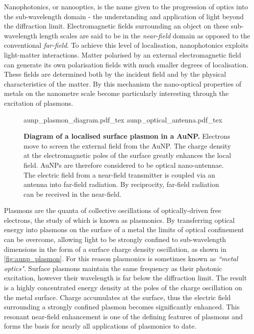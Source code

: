 \documentclass[12pt, a4paper, twoside]{book}
\begin{document}
Nanophotonics, or nanooptics, is the name given to the progression of optics into the sub-wavelength domain - the understanding and application of light beyond the diffraction limit. Electromagnetic fields surrounding an object on these sub-wavelength length scales are said to be in the \emph{near-field} domain as opposed to the conventional \emph{far-field}. To achieve this level of localisation, nanophotonics exploits light-matter interactions. Matter polarised by an external electromagnetic field can generate its own polarisation fields with much smaller degrees of localisation. These fields are determined both by the incident field and by the physical characteristics of the matter. By this mechanism the nano-optical properties of metals on the nanometre scale become particularly interesting through the excitation of plasmons.

\begin{figure}[bt]
\centering
\fontsize{10pt}{1em}\selectfont
\def\svgwidth{0.6\textwidth}
{aunp_plasmon_diagram.pdf_tex}
\def\svgwidth{0.35\textwidth}
{aunp_optical_antenna.pdf_tex}
\caption[Diagram of a localised surface plasmon in a AuNP.]{\textbf{Diagram of a localised surface plasmon in a AuNP.} Electrons move to screen the external field from the AuNP. The charge density at the electromagnetic poles of the surface greatly enhances the local field. AuNPs are therefore considered to be optical nano-antennae. The electric field from a near-field transmitter is coupled via an antenna into far-field radiation. By reciprocity, far-field radiation can be received in the near-field.}
\label{fig:aunp_plasmon}
\end{figure}

Plasmons are the quanta of collective oscillations of optically-driven free electrons, the study of which is known as plasmonics. By transferring optical energy into plasmons on the surface of a metal the limits of optical confinement can be overcome, allowing light to be strongly confined to sub-wavelength dimensions in the form of a surface charge density oscillation, as shown in \autoref{fig:aunp_plasmon}. For this reason plasmonics is sometimes known as \emph{``metal optics"}. Surface plasmons maintain the same frequency as their photonic excitation, however their wavelength is far below the diffraction limit. The result is a highly concentrated energy density at the poles of the charge oscillation on the metal surface. Charge accumulates at the surface, thus the electric field surrounding a strongly confined plasmon becomes significantly enhanced. This resonant near-field enhancement is one of the defining features of plasmons and forms the basis for nearly all applications of plasmonics to date.
\end{document}
